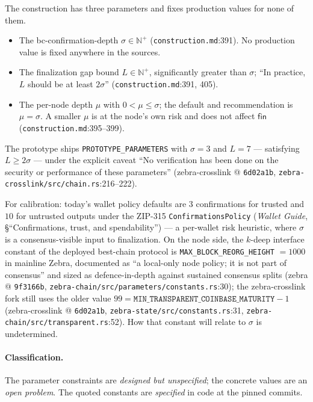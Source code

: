 \documentclass[11pt,a4paper]{article}
\theoremstyle{definition}
\newcommand{\N}{\mathbb{N}}
\begin{document}
The construction has three parameters and fixes production values for
none of them.
\begin{itemize}
\item The bc-confirmation-depth $\sigma \in \N^{+}$
  (\texttt{construction.md}:391). No production value is fixed anywhere
  in the sources.
\item The finalization gap bound $L \in \N^{+}$, significantly greater
  than $\sigma$; ``In practice, $L$ should be at least $2\sigma$''
  (\texttt{construction.md}:391, 405).
\item The per-node depth $\mu$ with $0 < \mu \le \sigma$; the default and
  recommendation is $\mu = \sigma$. A smaller $\mu$ is at the node's own
  risk and does not affect $\mathsf{fin}$
  (\texttt{construction.md}:395--399).
\end{itemize}
The prototype ships \texttt{PROTOTYPE\_PARAMETERS} with $\sigma = 3$ and
$L = 7$ --- satisfying $L \ge 2\sigma$ --- under the explicit caveat
``No verification has been done on the security or performance of these
parameters'' (zebra-crosslink @ \texttt{6d02a1b},
\texttt{zebra-crosslink/src/chain.rs}:216--222).

For calibration: today's wallet policy defaults are $3$ confirmations for
trusted and $10$ for untrusted outputs under the ZIP-315
\texttt{ConfirmationsPolicy} (\emph{Wallet Guide}, \S``Confirmations,
trust, and spendability'') --- a per-wallet risk heuristic, where
$\sigma$ is a consensus-visible input to finalization. On the node side,
the $k$-deep interface constant of the deployed best-chain protocol is
\texttt{MAX\_BLOCK\_REORG\_HEIGHT} $= 1000$ in mainline Zebra, documented
as ``a local-only node policy; it is not part of consensus'' and sized as
defence-in-depth against sustained consensus splits (zebra @
\texttt{9f3166b}, \texttt{zebra-chain/src/parameters/constants.rs}:30);
the zebra-crosslink fork still uses the older value $99 =
\texttt{MIN\_TRANSPARENT\_COINBASE\_MATURITY} - 1$ (zebra-crosslink @
\texttt{6d02a1b}, \texttt{zebra-state/src/constants.rs}:31,
\texttt{zebra-chain/src/transparent.rs}:52). How that constant will
relate to $\sigma$ is undetermined.

\paragraph{Classification.} The parameter constraints are \emph{designed
but unspecified}; the concrete values are an \emph{open problem}. The
quoted constants are \emph{specified} in code at the pinned commits.
\end{document}
